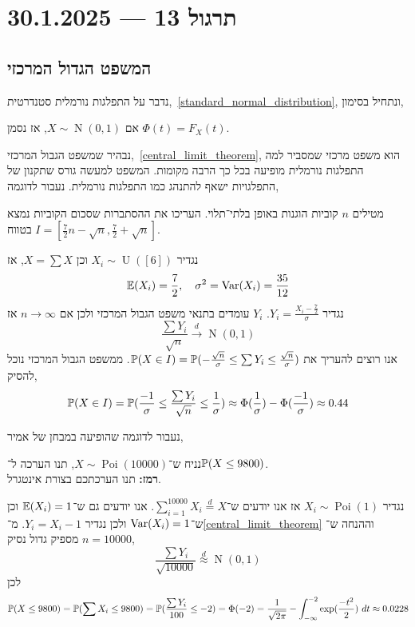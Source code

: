 \section{תרגול 13 --- 30.1.2025}
\subsection{המשפט הגדול המרכזי}
נדבר על התפלגות נורמלית סטנדרטית,\ \ref{standard_normal_distribution}, ונתחיל בסימון,
\begin{notation}
	אם $X \sim \operatorname{N}(0, 1)$, אז נסמן $\Phi(t) = F_X(t)$.
\end{notation}
נבהיר שמשפט הגבול המרכזי,\ \ref{central_limit_theorem}, הוא משפט מרכזי שמסביר למה התפלגות נורמלית מופיעה בכל כך הרבה מקומות.
המשפט למעשה גורס שתקנון של התפלגויות ישאף להתנהג כמו התפלגות נורמלית.
נעבור לדוגמה,
\begin{exercise}
	מטילים $n$ קוביות הוגנות באופן בלתי־תלוי.
	העריכו את ההסתברות שסכום הקוביות נמצא בטווח $I = [\frac{7}{2}n - \sqrt{n}, \frac{7}{2} + \sqrt{n}]$.
\end{exercise}
\begin{solution}
	נגדיר $X_i \sim \operatorname{U}([6])$ וכן $X = \sum X$, אז
	\[
		\mathbb{E}(X_i) = \frac{7}{2},
		\quad
		\sigma^2 = \operatorname{Var}(X_i) = \frac{35}{12}
	\]
	נגדיר $Y_i = \frac{X_i - \frac{7}{2}}{\sigma}$.
	$Y_i$ עומדים בתנאי משפט הגבול המרכזי ולכן אם $n \to \infty$ אז
	\[
		\frac{\sum Y_i}{\sqrt{n}} \xrightarrow{d} \operatorname{N}(0, 1)
	\]
	אנו רוצים להעריך את $\mathbb{P}(X \in I) = \mathbb{P}(-\frac{\sqrt{n}}{\sigma} \le \sum Y_i \le \frac{\sqrt{n}}{\sigma})$.
	ממשפט הגבול המרכזי נוכל להסיק,
	\[
		\mathbb{P}(X \in I)
		= \mathbb{P}(\frac{-1}{\sigma} \le \frac{\sum Y_i}{\sqrt{n}} \le \frac{1}{\sigma})
		\approx \Phi(\frac{1}{\sigma}) - \Phi(\frac{-1}{\sigma})
		\approx 0.44
	\]
\end{solution}
נעבור לדוגמה שהופיעה במבחן של אמיר,
\begin{exercise}
	נניח ש־$X \sim \operatorname{Poi}(10000)$,
	תנו הערכה ל־$\mathbb{P}(X \le 9800)$. \\
	\textbf{רמז:} תנו הערכתכם בצורת אינטגרל.
\end{exercise}
\begin{solution}
	נגדיר $X_i \sim \operatorname{Poi}(1)$ אז אנו יודעים ש־$\sum_{i = 1}^{10000} X_i \overset{d}{=} X$.
	אנו יודעים גם ש־$\mathbb{E}(X_i) = 1$ וכן ש־$\operatorname{Var}(X_i) = 1$ ולכן נגדיר $Y_i = X_i - 1$.
	מ־\ref{central_limit_theorem} וההנחה ש־$n = 10000$ מספיק גדול נסיק,
	\[
		\frac{\sum Y_i}{\sqrt{10000}}
		\overset{d}{\approx} \operatorname{N}(0, 1)
	\]
	לכן
	\[
		\mathbb{P}(X \le 9800)
		= \mathbb{P}(\sum X_i \le 9800)
		= \mathbb{P}(\frac{\sum Y_i}{100} \le -2)
		= \Phi(-2)
		= \frac{1}{\sqrt{2\pi}} - \int_{-\infty}^{-2} \exp(\frac{-t^2}{2})\ dt
		\approx 0.0228
	\]
\end{solution}

